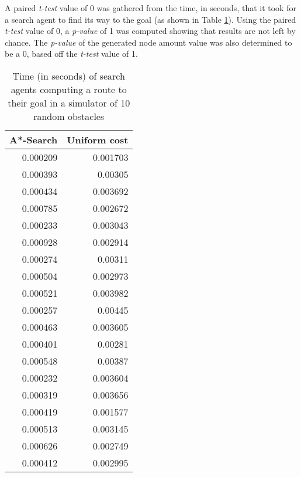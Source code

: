 \documentclass[11pt]{article}
\begin{document}
A paired \emph{t-test} value of 0 was gathered from the time, in seconds, that it took for a search agent to find its
way to the goal (as shown in Table \ref{tab:org0169a68}). Using the paired \emph{t-test} value of 0, a 
\emph{p-value} of 1 was computed showing that results are not left by chance.
The \emph{p-value} of the generated node amount value was also determined to be a 0, based off the \emph{t-test}
value of 1. 
\begin{table}[htbp]
\caption{\label{tab:org0169a68}Time (in seconds) of search agents computing a route to their goal in a simulator of 10 random obstacles}
\centering
\begin{tabular}{rr}
A*-Search & Uniform cost\\
\hline
0.000209 & 0.001703\\
0.000393 & 0.00305\\
0.000434 & 0.003692\\
0.000785 & 0.002672\\
0.000233 & 0.003043\\
0.000928 & 0.002914\\
0.000274 & 0.00311\\
0.000504 & 0.002973\\
0.000521 & 0.003982\\
0.000257 & 0.00445\\
0.000463 & 0.003605\\
0.000401 & 0.00281\\
0.000548 & 0.00387\\
0.000232 & 0.003604\\
0.000319 & 0.003656\\
0.000419 & 0.001577\\
0.000513 & 0.003145\\
0.000626 & 0.002749\\
0.000412 & 0.002995\\
\end{tabular}
\end{table}
\end{document}
